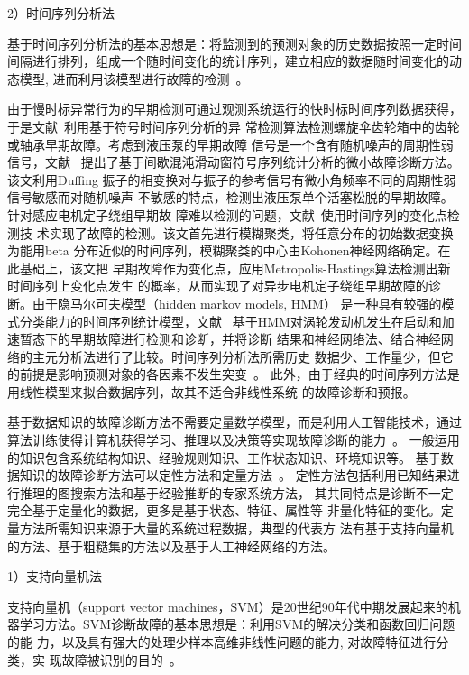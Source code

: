 2）时间序列分析法

基于时间序列分析法的基本思想是：将监测到的预测对象的历史数据按照一定时间
间隔进行排列，组成一个随时间变化的统计序列，建立相应的数据随时间变化的动
态模型, 进而利用该模型进行故障的检测~\cite{zhao2009sliding}。

由于慢时标异常行为的早期检测可通过观测系统运行的快时标时间序列数据获得，
于是文献~利用基于符号时间序列分析的异
常检测算法检测螺旋伞齿轮箱中的齿轮或轴承早期故障。考虑到液压泵的早期故障
信号是一个含有随机噪声的周期性弱信号，文献~
提出了基于间歇混沌滑动窗符号序列统计分析的微小故障诊断方法。该文利用Duffing
振子的相变换对与振子的参考信号有微小角频率不同的周期性弱信号敏感而对随机噪声
不敏感的特点，检测出液压泵单个活塞松脱的早期故障。针对感应电机定子绕组早期故
障难以检测的问题，文献~使用时间序列的变化点检测技
术实现了故障的检测。该文首先进行模糊聚类，将任意分布的初始数据变换为能用beta
分布近似的时间序列，模糊聚类的中心由Kohonen神经网络确定。在此基础上，该文把
早期故障作为变化点，应用Metropolis-Hastings算法检测出新时间序列上变化点发生
的概率，从而实现了对异步电机定子绕组早期故障的诊断。由于隐马尔可夫模型（hidden markov models, HMM）
是一种具有较强的模式分类能力的时间序列统计模型，文献~
基于HMM对涡轮发动机发生在启动和加速暂态下的早期故障进行检测和诊断，并将诊断
结果和神经网络法、结合神经网络的主元分析法进行了比较。时间序列分析法所需历史
数据少、工作量少，但它的前提是影响预测对象的各因素不发生突变~\cite{kjolle2006protection}。
此外，由于经典的时间序列方法是用线性模型来拟合数据序列，故其不适合非线性系统
的故障诊断和预报。

基于数据知识的故障诊断方法不需要定量数学模型，而是利用人工智能技术，通过
算法训练使得计算机获得学习、推理以及决策等实现故障诊断的能力~\cite{venkatasubramanian2003reviewpart3}。
一般运用的知识包含系统结构知识、经验规则知识、工作状态知识、环境知识等。
基于数据知识的故障诊断方法可以定性方法和定量方法~\cite{venkatasubramanian2003reviewpart3, venkatasubramanian2003reviewpart1, venkatasubramanian2003reviewpart2}。
定性方法包括利用已知结果进行推理的图搜索方法和基于经验推断的专家系统方法，
其共同特点是诊断不一定完全基于定量化的数据，更多是基于状态、特征、属性等
非量化特征的变化。定量方法所需知识来源于大量的系统过程数据，典型的代表方
法有基于支持向量机的方法、基于粗糙集的方法以及基于人工神经网络的方法。

1）支持向量机法

支持向量机（support vector machines，SVM）是20世纪90年代中期发展起来的机
器学习方法。SVM诊断故障的基本思想是：利用SVM的解决分类和函数回归问题的能
力，以及具有强大的处理少样本高维非线性问题的能力, 对故障特征进行分类，实
现故障被识别的目的~\cite{huqiao2006improved}。

